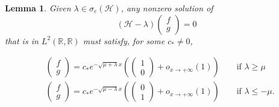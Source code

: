 \documentclass[11 pt]{amsart}
\newtheorem{lem}{Lemma}[section]
\theoremstyle{definition}
\theoremstyle{remark}
\numberwithin{equation}{section}
\begin{document}
\begin{lem}
  \label{fiberoptic}Given $\lambda \in  \sigma_e (\mathcal{H})$, any nonzero solution
  of
  \[ (\mathcal{H}- \lambda) \left(\begin{array}{c}
       f\\
       g
     \end{array}\right) = 0 \]
  that is in $L^2 (\mathbb{R}, \mathbb{R})$ must satisfy, for some $c_* \neq 0$,

\begin{align*}
& \left(\begin{array}{c}
       f\\
       g
     \end{array}\right) = c_{\ast} e^{-\sqrt{\mu + \lambda} x} \left( \left(\begin{array}{c}
       1\\
       0
     \end{array}\right) + o_{x \rightarrow + \infty} (1) \right)
      \qquad \mbox{if $\lambda \geq \mu$} \\
& \left(\begin{array}{c}
       f\\
       g
     \end{array}\right) = c_{\ast} e^{-\sqrt{\mu - \lambda} x}
     \left( \left(\begin{array}{c}
       0\\
       1
     \end{array}\right) + o_{x \rightarrow + \infty} (1) \right) \qquad \mbox{if $\lambda \leq - \mu$}.
\end{align*}

\end{lem}
\end{document}

